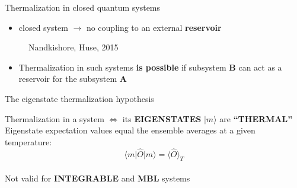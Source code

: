 \documentclass[1pt]{beamer}
\newcommand{\bra}[1]{\langle #1 \vert}
\newcommand{\ket}[1]{\vert#1\rangle}
\begin{document}
\begin{frame}{Thermalization in closed quantum systems}
\begin{itemize}
	\item closed system $\rightarrow$ no coupling to an external \textbf{reservoir}
\end{itemize}
\begin{figure}
\caption{Nandkishore, Huse, 2015}
\end{figure} 
\begin{itemize}
\item Thermalization in such systems \textbf{is possible} if subsystem \textbf{B} can act as a reservoir for the subsystem \textbf{A}
\end{itemize}
\end{frame}
\begin{frame}{The eigenstate thermalization hypothesis}

Thermalization in a system $\Longleftrightarrow$ its \textbf{EIGENSTATES} $\ket{m}$ are \textbf{``THERMAL''}\\\vspace{5mm}
Eigenstate expectation values equal the ensemble averages at a given temperature:
$$\bra{m} \hat{O} \ket{m}=\langle \hat{O} \rangle_T$$ \\ \vspace{7mm}
Not valid for \textbf{INTEGRABLE} and \textbf{MBL} systems

\end{frame}
\end{document}
